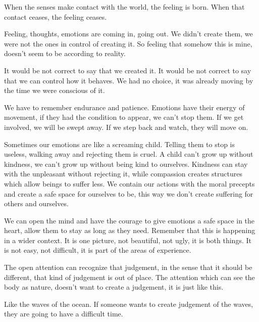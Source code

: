When the senses make contact with the world, the feeling is born. When
that contact ceases, the feeling ceases.

Feeling, thoughts, emotions are coming in, going out. We didn't create
them, we were not the ones in control of creating it. So feeling that
somehow this is mine, doesn't seem to be according to reality.

It would be not correct to say that we created it. It would be not
correct to say that we can control how it behaves. We had no choice, it
was already moving by the time we were conscious of it.

We have to remember endurance and patience. Emotions have their energy
of movement, if they had the condition to appear, we can't stop them. If
we get involved, we will be swept away. If we step back and watch, they
will move on.

Sometimes our emotions are like a screaming child. Telling them to stop
is useless, walking away and rejecting them is cruel. A child can't grow
up without kindness, we can't grow up without being kind to ourselves.
Kindness can stay with the unpleasant without rejecting it, while
compassion creates structures which allow beings to suffer less. We
contain our actions with the moral precepts and create a safe space for
ourselves to be, this way we don't create suffering for others and
ourselves.

We can open the mind and have the courage to give emotions a safe space
in the heart, allow them to stay as long as they need. Remember that
this is happening in a wider context. It is one picture, not beautiful,
not ugly, it is both things. It is not easy, not difficult, it is part
of the areas of experience.

The open attention can recognize that judgement, in the sense that it
should be different, that kind of judgement is out of place. The
attention which can see the body as nature, doesn't want to create a
judgement, it is just like this.

Like the waves of the ocean. If someone wants to create judgement of the
waves, they are going to have a difficult time.
